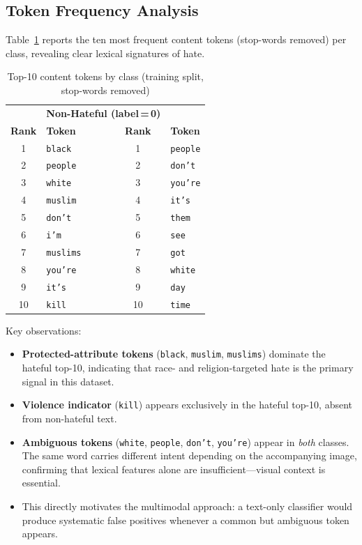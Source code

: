\documentclass[12pt,a4paper]{article}
\begin{document}
\subsection{Token Frequency Analysis}

Table~\ref{tab:topwords} reports the ten most frequent content tokens (stop-words removed) per class, revealing clear lexical signatures of hate.

\begin{table}[H]
  \centering
  \caption{Top-10 content tokens by class (training split, stop-words removed)}
  \renewcommand{\arraystretch}{1.25}
  \begin{tabular}{clcl}
    \toprule
    \rowcolor{primaryblue!15}
    \multicolumn{2}{c}{\textbf{Hateful (label\,=\,1)}} &
    \multicolumn{2}{c}{\textbf{Non-Hateful (label\,=\,0)}} \\
    \rowcolor{primaryblue!15}
    \textbf{Rank} & \textbf{Token}    & \textbf{Rank} & \textbf{Token}   \\
    \midrule
    1  & \texttt{black}    & 1  & \texttt{people}  \\
    2  & \texttt{people}   & 2  & \texttt{don't}   \\
    3  & \texttt{white}    & 3  & \texttt{you're}  \\
    4  & \texttt{muslim}   & 4  & \texttt{it's}    \\
    5  & \texttt{don't}    & 5  & \texttt{them}    \\
    6  & \texttt{i'm}      & 6  & \texttt{see}     \\
    7  & \texttt{muslims}  & 7  & \texttt{got}     \\
    8  & \texttt{you're}   & 8  & \texttt{white}   \\
    9  & \texttt{it's}     & 9  & \texttt{day}     \\
    10 & \texttt{kill}     & 10 & \texttt{time}    \\
    \bottomrule
  \end{tabular}
  \label{tab:topwords}
\end{table}

Key observations:
\begin{itemize}
  \item \textbf{Protected-attribute tokens} (\texttt{black}, \texttt{muslim}, \texttt{muslims}) dominate the hateful top-10, indicating that race- and religion-targeted hate is the primary signal in this dataset.
  \item \textbf{Violence indicator} (\texttt{kill}) appears exclusively in the hateful top-10, absent from non-hateful text.
  \item \textbf{Ambiguous tokens} (\texttt{white}, \texttt{people}, \texttt{don't}, \texttt{you're}) appear in \textit{both} classes. The same word carries different intent depending on the accompanying image, confirming that lexical features alone are insufficient---visual context is essential.
  \item This directly motivates the multimodal approach: a text-only classifier would produce systematic false positives whenever a common but ambiguous token appears.
\end{itemize}
\end{document}
